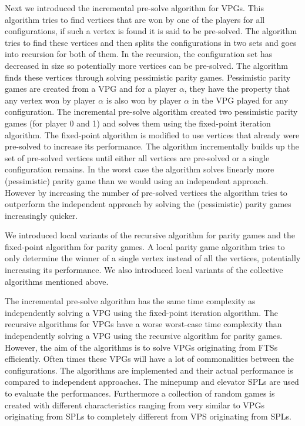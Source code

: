 Next we introduced the incremental pre-solve algorithm for VPGs. This algorithm tries to find vertices that are won by one of the players for all configurations, if such a vertex is found it is said to be pre-solved. The algorithm tries to find these vertices and then splits the configurations in two sets and goes into recursion for both of them. In the recursion, the configuration set has decreased in size so potentially more vertices can be pre-solved. The algorithm finds these vertices through solving pessimistic parity games. Pessimistic parity games are created from a VPG and for a player $\alpha$, they have the property that any vertex won by player $\alpha$ is also won by player $\alpha$ in the VPG played for any configuration. The incremental pre-solve algorithm created two pessimistic parity games (for player 0 and 1) and solves them using the fixed-point iteration algorithm. The fixed-point algorithm is modified to use vertices that already were pre-solved to increase its performance. The algorithm incrementally builds up the set of pre-solved vertices until either all vertices are pre-solved or a single configuration remains. In the worst case the algorithm solves linearly more (pessimistic) parity game than we would using an independent approach. However by increasing the number of pre-solved vertices the algorithm tries to outperform the independent approach by solving the (pessimistic) parity games increasingly quicker.

We introduced local variants of the recursive algorithm for parity games and the fixed-point algorithm for parity games. A local parity game algorithm tries to only determine the winner of a single vertex instead of all the vertices, potentially increasing its performance. We also introduced local variants of the collective algorithms mentioned above.

The incremental pre-solve algorithm has the same time complexity as independently solving a VPG using the fixed-point iteration algorithm. The recursive algorithms for VPGs have a worse worst-case time complexity than independently solving a VPG using the recursive algorithm for parity games. However, the aim of the algorithms is to solve VPGs originating from FTSs efficiently. Often times these VPGs will have a lot of commonalities between the configurations. The algorithms are implemented and their actual performance is compared to independent approaches. The minepump and elevator SPLs are used to evaluate the performances. Furthermore a collection of random games is created with different characteristics ranging from very similar to VPGs originating from SPLs to completely different from VPS originating from SPLs.

